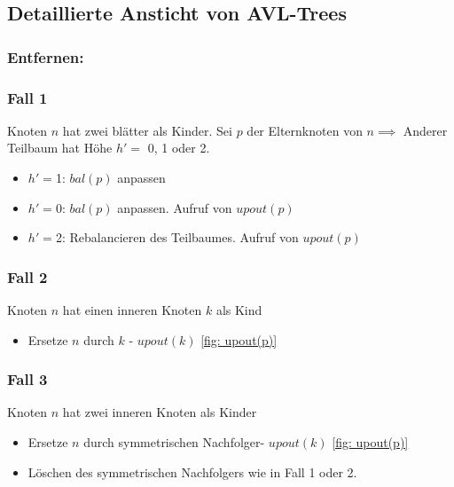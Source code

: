 \documentclass[a4paper]{article}
\begin{document}
\subsection{Detaillierte Ansticht von AVL-Trees} \label{AVL-Trees-Anhang} 
\subsubsection{Entfernen:}
\subsubsection*{Fall 1}

Knoten $n$ hat zwei blätter als Kinder. Sei $p$ der Elternknoten von $n \implies $ Anderer Teilbaum hat Höhe $h' =$ 0, 1 oder 2.
\begin{itemize}
    \item $h' = $1: $bal(p)$ anpassen
    \item $h' = $0: $bal(p)$ anpassen. Aufruf von $upout(p)$
    \item $h' = $2: Rebalancieren des Teilbaumes. Aufruf von $upout(p)$
\end{itemize}



\subsubsection*{Fall 2}
Knoten $n$ hat einen inneren Knoten $k$ als Kind
\begin{itemize}
    \item Ersetze $n$ durch $k$ -  $upout(k)$ \ref{fig: upout(p)}
\end{itemize}



\subsubsection*{Fall 3}
Knoten $n$ hat zwei inneren Knoten als Kinder
\begin{itemize}
    \item Ersetze $n$ durch symmetrischen Nachfolger-  $upout(k)$ \ref{fig: upout(p)}
    \item Löschen des symmetrischen Nachfolgers wie in Fall 1 oder 2.
\end{itemize}
\end{document}
